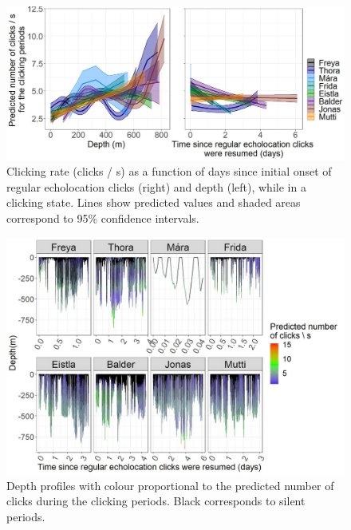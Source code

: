 \documentclass[preprint]{JASA}
\begin{document}
\begin{figure}[t]
\includegraphics[width=6in]{Figure5}%

\caption{\label{fig:FIG5}{Clicking rate (clicks / s) as a function of days since initial onset of regular echolocation clicks (right) and depth (left), while in a clicking state. Lines show predicted values and shaded areas correspond to 95\% confidence intervals.}}
\raggedright

\end{figure}


\begin{figure}[t]
\includegraphics[width=6in]{Figure6}%
\caption{\label{fig:FIG6}{Depth profiles with colour proportional to the predicted number of clicks during the clicking periods. Black corresponds to silent periods.}}
\raggedright

\end{figure}
\end{document}
